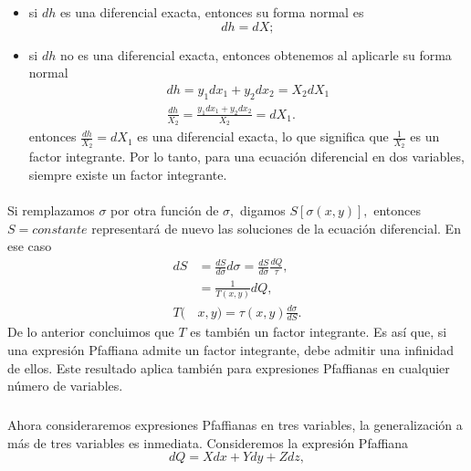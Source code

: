 \documentclass{article}
\theoremstyle{definition} \newtheorem{defi}{Definici\'on}
\theoremstyle{definition} \newtheorem{teo}{Teorema}
\theoremstyle{definition} \newtheorem{cor}{Corolario}
\begin{document}
\begin{itemize}
\item si $dh$ es una diferencial exacta, entonces su forma normal es $$dh=dX;$$
\item si $dh$ no es una diferencial exacta, entonces obtenemos al aplicarle su forma normal
\begin{align}
dh=y_1dx_1+y_2dx_2=X_2dX_1\\
\frac{dh}{X_2}=\frac{y_1dx_1+y_2dx_2}{X_2}=dX_1.
\end{align}
entonces $\frac{dh}{X_2}=dX_1$ es una diferencial exacta, lo que significa que $\frac{1}{X_2}$ es un factor integrante. Por lo tanto, para una ecuaci\'on diferencial en dos variables, siempre existe un factor integrante.
\end{itemize}
\paragraph{}
Si remplazamos $\sigma$ por otra funci\'on de $\sigma,$ digamos $S[\sigma(x, y)],$ entonces $S = constante$ representar\'a de nuevo las soluciones de la ecuaci\'on diferencial. En ese caso
\begin{align}
dS &= \frac{dS}{d\sigma}d\sigma = \frac{dS}{d\sigma}\frac{dQ}{\tau},\\
&= \frac{1}{T(x, y)}  dQ,\\
T(&x, y) = \tau(x, y)\frac{d\sigma}{dS}.
\end{align}
De lo anterior concluimos que $T$ es tambi\'en un factor integrante. Es as\'i que, si una expresi\'on Pfaffiana admite un factor integrante, debe admitir una infinidad de ellos. Este resultado aplica tambi\'en para expresiones Pfaffianas en cualquier n\'umero de variables.
\subparagraph{}
Ahora consideraremos expresiones Pfaffianas en tres variables, la generalizaci\'on a m\'as de tres variables es inmediata. Consideremos la expresi\'on Pfaffiana
\begin{equation}\label{pfaffclean3}
dQ = X dx + Y dy + Z dz,
\end{equation}
\end{document}
